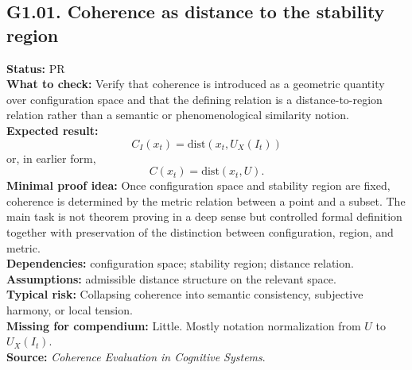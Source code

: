 \documentclass[12pt]{article}
\begin{document}
	\subsection*{G1.01. Coherence as distance to the stability region}
	\textbf{Status:} PR \\
	\textbf{What to check:} Verify that coherence is introduced as a geometric quantity over configuration space and that the defining relation is a distance-to-region relation rather than a semantic or phenomenological similarity notion. \\
	\textbf{Expected result:} 
	\[
	C_I(x_t)=\mathrm{dist}(x_t,U_X(I_t))
	\]
	or, in earlier form,
	\[
	C(x_t)=\mathrm{dist}(x_t,U).
	\]
	\textbf{Minimal proof idea:} Once configuration space and stability region are fixed, coherence is determined by the metric relation between a point and a subset. The main task is not theorem proving in a deep sense but controlled formal definition together with preservation of the distinction between configuration, region, and metric. \\
	\textbf{Dependencies:} configuration space; stability region; distance relation. \\
	\textbf{Assumptions:} admissible distance structure on the relevant space. \\
	\textbf{Typical risk:} Collapsing coherence into semantic consistency, subjective harmony, or local tension. \\
	\textbf{Missing for compendium:} Little. Mostly notation normalization from $U$ to $U_X(I_t)$. \\
	\textbf{Source:} \emph{Coherence Evaluation in Cognitive Systems}.
	
\end{document}
